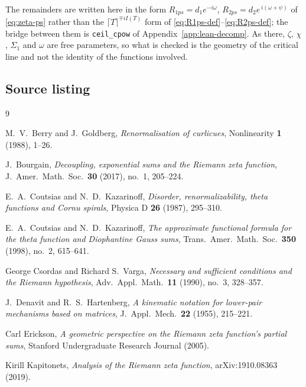 \documentclass[11pt]{article}
\theoremstyle{definition}
\begin{document}
The remainders are written here in the form $R_{1ps}=d_1e^{-i\omega}$,
$R_{2ps}=d_2e^{\,i(\omega+\psi)}$ of \eqref{eq:zeta-ps} rather than the
$\lceil T\rceil^{\mp iI(T)}$ form of
\eqref{eq:R1ps-def}--\eqref{eq:R2ps-def}; the bridge between them is
\texttt{ceil\_cpow} of Appendix~\ref{app:lean-decomp}. As there, $\zeta$, $\chi$,
$\Sigma_1$ and $\omega$ are free parameters, so what is checked is the geometry
of the critical line and not the identity of the functions involved.

\subsection{Source listing}



\begin{thebibliography}{9}

M.~V.\ Berry and J.~Goldberg, \emph{Renormalisation of curlicues},
Nonlinearity \textbf{1} (1988), 1--26.

J.~Bourgain, \emph{Decoupling, exponential sums and the Riemann zeta function},
J.\ Amer.\ Math.\ Soc.\ \textbf{30} (2017), no.~1, 205--224.

E.~A.\ Coutsias and N.~D.\ Kazarinoff, \emph{Disorder, renormalizability, theta
functions and Cornu spirals}, Physica D \textbf{26} (1987), 295--310.

E.~A.\ Coutsias and N.~D.\ Kazarinoff, \emph{The approximate functional formula
for the theta function and Diophantine Gauss sums}, Trans.\ Amer.\ Math.\ Soc.\
\textbf{350} (1998), no.~2, 615--641.

George Csordas and Richard S.\ Varga, \emph{Necessary and sufficient conditions
and the Riemann hypothesis}, Adv.\ Appl.\ Math.\ \textbf{11} (1990), no.~3,
328--357.

J.~Denavit and R.~S.\ Hartenberg, \emph{A kinematic notation for lower-pair
mechanisms based on matrices}, J.\ Appl.\ Mech.\ \textbf{22} (1955), 215--221.

Carl Erickson, \emph{A geometric perspective on the Riemann zeta function's
partial sums}, Stanford Undergraduate Research Journal (2005).

Kirill Kapitonets, \emph{Analysis of the Riemann zeta function},
arXiv:1910.08363 (2019).


\end{thebibliography}
\end{document}
